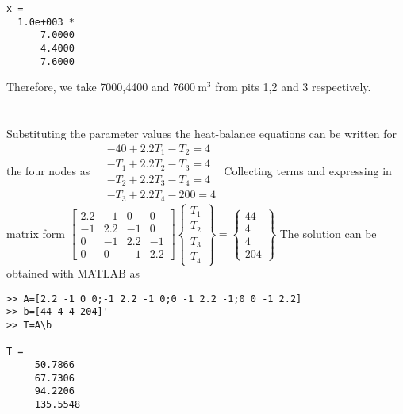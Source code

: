 \documentclass[../main.tex]{subfiles}
\begin{document}
\begin{enumerate}[label=\bfseries(\alph*)]
\begin{lstlisting}[numbers=none]
x =
  1.0e+003 *
 	  7.0000
 	  4.4000
 	  7.6000
\end{lstlisting}
\bigbreak
Therefore, we take 7000,4400 and $7600 \mathrm{~m}^{3}$ from pits 1,2 and 3 respectively.
\bigbreak


\section{}
Substituting the parameter values the heat-balance equations can be written for the four nodes as
\bigbreak$
\begin{aligned}
&-40+2.2 T_{1}-T_{2}=4 \\
&-T_{1}+2.2 T_{2}-T_{3}=4 \\
&-T_{2}+2.2 T_{3}-T_{4}=4 \\
&-T_{3}+2.2 T_{4}-200=4
\end{aligned}$
\bigbreak
Collecting terms and expressing in matrix form
\bigbreak
$\left[\begin{array}{cccc}
2.2 & -1 & 0 & 0 \\
-1 & 2.2 & -1 & 0 \\
0 & -1 & 2.2 & -1 \\
0 & 0 & -1 & 2.2
\end{array}\right]\left\{\begin{array}{l}
T_{1} \\
T_{2} \\
T_{3} \\
T_{4}
\end{array}\right\}=\left\{\begin{array}{c}
44 \\
4 \\
4 \\
204
\end{array}\right\}$
\bigbreak
The solution can be obtained with MATLAB as
\bigbreak
\begin{lstlisting}[numbers=none]
>> A=[2.2 -1 0 0;-1 2.2 -1 0;0 -1 2.2 -1;0 0 -1 2.2]
>> b=[44 4 4 204]'
>> T=A\b

T =
 	 50.7866
 	 67.7306
	 94.2206
	 135.5548 
\end{lstlisting}

\end{enumerate}
\end{document}
